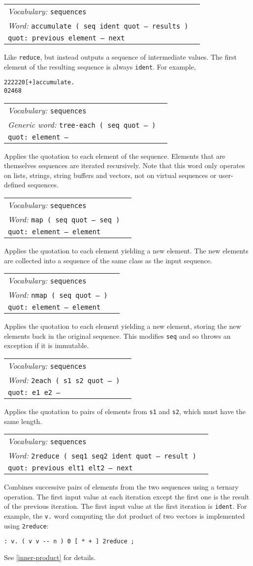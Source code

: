 \documentclass{book}
\newcommand{\tto}{\symbol{123}}
\newcommand{\ttc}{\symbol{125}}
\newcommand{\vocabulary}[1]{\emph{Vocabulary:} \texttt{#1}&\\}
\newcommand{\ordinaryword}[2]{\index{\texttt{#1}}\emph{Word:} \texttt{#2}&\\}
\newcommand{\genericword}[2]{\index{\texttt{#1}}\emph{Generic word:} \texttt{#2}&\\}
\newcommand{\wordtable}[1]{


\begin{tabularx}{12cm}{lX}
\hline
#1
\hline
\end{tabularx}

}
\begin{document}
\wordtable{
\vocabulary{sequences}
\ordinaryword{accumulate}{accumulate ( seq ident quot -- results )}
\texttt{quot:~previous element -- next}\\
}
Like \verb|reduce|, but instead outputs a sequence of intermediate values. The first element of the resulting sequence is always \verb|ident|. For example,
\begin{alltt}
  \tto 2 2 2 2 2 \ttc 0 [ + ] accumulate .
\tto 0 2 4 6 8 \ttc
\end{alltt}
\wordtable{
\vocabulary{sequences}
\genericword{tree-each}{tree-each ( seq quot -- )}
\texttt{quot:~element --}\\
}
Applies the quotation to each element of the sequence. Elements that are themselves sequences are iterated recursively. Note that this word only operates on lists, strings, string buffers and vectors, not on virtual sequences or user-defined sequences.
\wordtable{
\vocabulary{sequences}
\ordinaryword{map}{map ( seq quot -- seq )}
\texttt{quot:~element -- element}\\
}
Applies the quotation to each element yielding a new element. The new elements are collected into a sequence of the same class as the input sequence.
\wordtable{
\vocabulary{sequences}
\ordinaryword{nmap}{nmap ( seq quot -- )}
\texttt{quot:~element -- element}\\
}
Applies the quotation to each element yielding a new element, storing the new elements back in the original sequence. This modifies \texttt{seq} and so throws an exception if it is immutable.
\wordtable{
\vocabulary{sequences}
\ordinaryword{2each}{2each ( s1 s2 quot -- )}
\texttt{quot:~e1 e2 --}\\
}
Applies the quotation to pairs of elements from \texttt{s1} and \texttt{s2}, which must have the same length.

\wordtable{
\vocabulary{sequences}
\ordinaryword{2reduce}{2reduce ( seq1 seq2 ident quot -- result )}
\texttt{quot:~previous elt1 elt2 -- next}\\
}
Combines successive pairs of elements from the two sequences using a ternary operation. The first input value at each iteration except the first one is the result of the previous iteration. The first input value at the first iteration is \verb|ident|. For example, the \verb|v.| word computing the dot product of two vectors is implemented using \verb|2reduce|:
\begin{verbatim}
: v. ( v v -- n ) 0 [ * + ] 2reduce ;
\end{verbatim}
See \ref{inner-product} for details.
\end{document}
